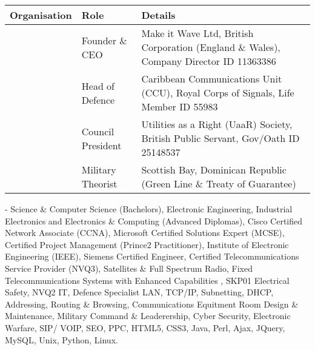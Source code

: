 \documentclass[letterpaper,10pt,english]{sphinxmanual}
\begin{document}
\begin{savenotes}\sphinxattablestart
\centering
\begin{tabulary}{\linewidth}[t]{|T|T|T|}
\hline
\sphinxstyletheadfamily 
Organisation
&\sphinxstyletheadfamily 
Role
&\sphinxstyletheadfamily 
Details
\\
\hline
\noindent{}
&
Founder \& CEO
&
Make it Wave Ltd, British Corporation (England \& Wales), Company Director ID 11363386
\\
\hline
\noindent{}
&
Head of Defence
&
Caribbean Communications Unit (CCU), Royal Corps of Signals, Life Member ID 55983
\\
\hline
\noindent{}
&
Council President
&
Utilities as a Right (UaaR) Society, British Public Servant, Gov/Oath ID 25148537
\\
\hline
\noindent{}
&
Military Theorist
&
Scottish Bay, Dominican Republic (Green Line \& Treaty of Guarantee)
\\
\hline
\end{tabulary}
\par
\sphinxattableend\end{savenotes}

 - Science \& Computer Science (Bachelors), Electronic Engineering, Industrial Electronics and Electronics \& Computing (Advanced Diplomas), Cisco Certified Network Associate (CCNA), Microsoft Certified Solutions Expert (MCSE), Certified Project Management (Prince2 Practitioner), Institute of Electronic Engineering (IEEE), Siemens Certified Engineer, Certified Telecommunications Service Provider (NVQ3), Satellites \& Full Spectrum Radio, Fixed Telecommunications Systems with Enhanced Capabilities , SKP01 Electrical Safety, NVQ2 IT, Defence Specialist LAN, TCP/IP, Subnetting, DHCP, Addressing, Routing \& Browsing, Communications Equitment Room Design \& Maintenance, Military Command \& Leaderership,  Cyber Security, Electronic Warfare, SIP/ VOIP, SEO, PPC, HTML5, CSS3, Java, Perl, Ajax, JQuery, MySQL, Unix, Python, Linux.



\renewcommand{\indexname}{Index}
\printindex
\end{document}
